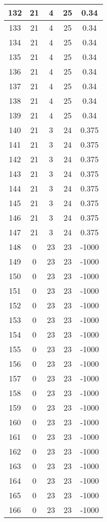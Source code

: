 \documentclass[letterpaper, 12pt]{article}
\begin{document}
\begin{longtable}{|c|c|c|c|c|}
\hline
132 & 21 & 4 & 25 & 0.34 \\
\hline
133 & 21 & 4 & 25 & 0.34 \\
\hline
134 & 21 & 4 & 25 & 0.34 \\
\hline
135 & 21 & 4 & 25 & 0.34 \\
\hline
136 & 21 & 4 & 25 & 0.34 \\
\hline
137 & 21 & 4 & 25 & 0.34 \\
\hline
138 & 21 & 4 & 25 & 0.34 \\
\hline
139 & 21 & 4 & 25 & 0.34 \\
\hline
140 & 21 & 3 & 24 & 0.375 \\
\hline
141 & 21 & 3 & 24 & 0.375 \\
\hline
142 & 21 & 3 & 24 & 0.375 \\
\hline
143 & 21 & 3 & 24 & 0.375 \\
\hline
144 & 21 & 3 & 24 & 0.375 \\
\hline
145 & 21 & 3 & 24 & 0.375 \\
\hline
146 & 21 & 3 & 24 & 0.375 \\
\hline
147 & 21 & 3 & 24 & 0.375 \\
\hline
148 & 0 & 23 & 23 & -1000 \\
\hline
149 & 0 & 23 & 23 & -1000 \\
\hline
150 & 0 & 23 & 23 & -1000 \\
\hline
151 & 0 & 23 & 23 & -1000 \\
\hline
152 & 0 & 23 & 23 & -1000 \\
\hline
153 & 0 & 23 & 23 & -1000 \\
\hline
154 & 0 & 23 & 23 & -1000 \\
\hline
155 & 0 & 23 & 23 & -1000 \\
\hline
156 & 0 & 23 & 23 & -1000 \\
\hline
157 & 0 & 23 & 23 & -1000 \\
\hline
158 & 0 & 23 & 23 & -1000 \\
\hline
159 & 0 & 23 & 23 & -1000 \\
\hline
160 & 0 & 23 & 23 & -1000 \\
\hline
161 & 0 & 23 & 23 & -1000 \\
\hline
162 & 0 & 23 & 23 & -1000 \\
\hline
163 & 0 & 23 & 23 & -1000 \\
\hline
164 & 0 & 23 & 23 & -1000 \\
\hline
165 & 0 & 23 & 23 & -1000 \\
\hline
166 & 0 & 23 & 23 & -1000 \\

\end{longtable}
\end{document}
